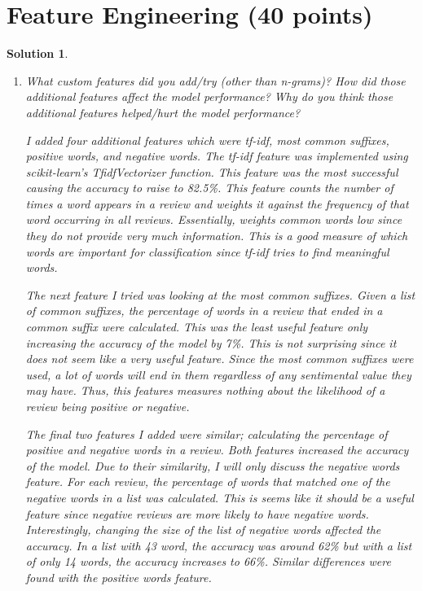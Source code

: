 \documentclass[12pt]{article}
\newtheorem*{solution*}{Solution}
\theoremstyle{definition}
\begin{document}
	\section{Feature Engineering (40 points)}
	\begin{solution*}\leavevmode
		\begin{enumerate}[label=\arabic*.,font=\upshape]
			\item \textnormal{What custom features did you add/try (other than n-grams)? How did those additional features
				affect the model performance? Why do you think those additional features helped/hurt
				the model performance?} 
			
			I added four additional features which were tf-idf, most common suffixes, positive words, and negative words. The tf-idf feature was implemented using scikit-learn's TfidfVectorizer function. This feature was the most successful causing the accuracy to raise to 82.5\%. This feature counts the number of times a word appears in a review and weights it against the frequency of that word occurring in all reviews. Essentially, weights common words low since they do not provide very much information. This is a good measure of which words are important for classification since tf-idf tries to find meaningful words. 
			
			The next feature I tried was looking at the most common suffixes. Given a list of common suffixes, the percentage of words in a review that ended in a common suffix were calculated. This was the least useful feature only increasing the accuracy of the model by 7\%. This is not surprising since it does not seem like a very useful feature. Since the most common suffixes were used, a lot of words will end in them regardless of any sentimental value they may have. Thus, this features measures nothing about the likelihood of a review being positive or negative. 
			
			The final two features I added were similar; calculating the percentage of positive and negative words in a review. Both features increased the accuracy of the model. Due to their similarity, I will only discuss the negative words feature. For each review, the percentage of words that matched one of the negative words in a list was calculated. This is seems like it should be a useful feature since negative reviews are more likely to have negative words. Interestingly, changing the size of the list of negative words affected the accuracy. In a list with 43 word, the accuracy was around 62\% but with a list of only 14 words, the accuracy increases to 66\%. Similar differences were found with the positive words feature. 
			

\end{enumerate}
\end{solution*}
\end{document}

